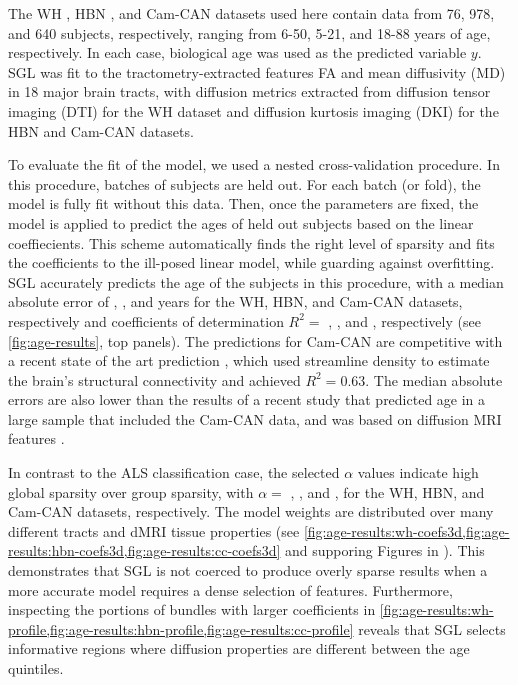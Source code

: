 \documentclass[10pt,letterpaper]{article}
\begin{document}
The WH \cite{yeatman2014lifespan}, HBN \cite{alexander2017open}, and Cam-CAN
\cite{shafto2014cambridge,taylor2017cambridge} datasets used here contain
data from 76, 978, and 640 subjects, respectively, ranging from 6-50, 5-21,
and 18-88 years of age, respectively. In each case, biological age was used
as the predicted variable $y$. SGL was fit to the tractometry-extracted
features FA and mean diffusivity (MD) in 18 major brain tracts, with diffusion metrics extracted
from diffusion tensor imaging (DTI) for the WH dataset and diffusion kurtosis
imaging (DKI) \cite{jensen2005diffusion} for the HBN and Cam-CAN datasets.

To evaluate the fit of the model, we used a nested cross-validation
procedure. In this procedure, batches of subjects are held out. For each
batch (or fold), the model is fully fit without this data. Then, once the
parameters are fixed, the model is applied to predict the ages of held out
subjects based on the linear coeffiecients. This scheme automatically finds
the right level of sparsity and fits the coefficients to the ill-posed linear
model, while guarding against overfitting. SGL accurately predicts the age of
the subjects in this procedure, with a median absolute error of {\whMae},
{\hbnMae}, and {\camcanMae} years for the WH, HBN, and Cam-CAN datasets,
respectively and coefficients of determination $R^2 = $ {\whRsq} , {\hbnRsq},
and {\camcanRsq}, respectively (see \cref{fig:age-results}, top panels). The
predictions for Cam-CAN are competitive with a recent state of the art
prediction \cite{mcpherson2020single}, which used streamline density to
estimate the brain's structural connectivity and achieved $R^2 = 0.63$. The
median absolute errors are also lower than the results of a recent study that
predicted age in a large sample that included the Cam-CAN data, and was based
on diffusion MRI features \cite{Richard2018-ux}.

In contrast to the ALS classification case, the selected $\alpha$ values
indicate high global sparsity over group sparsity, with $\alpha = $
{\whLRatio}, {\hbnLRatio}, and {\ccLRatio}, for the WH, HBN, and Cam-CAN
datasets, respectively. The model weights are distributed over many different
tracts and dMRI tissue properties (see
\cref{fig:age-results:wh-coefs3d,fig:age-results:hbn-coefs3d,fig:age-results:cc-coefs3d}
and supporing Figures in ).
This demonstrates that SGL is not coerced to produce overly sparse results
when a more accurate model requires a dense selection of features.
Furthermore, inspecting the portions of bundles with larger coefficients in
\cref{fig:age-results:wh-profile,fig:age-results:hbn-profile,fig:age-results:cc-profile}
reveals that SGL selects informative regions where diffusion properties are
different between the age quintiles.
\end{document}

